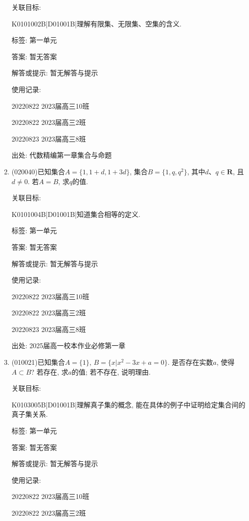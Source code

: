 \documentclass[10pt,a4paper]{article}
\begin{document}
\begin{enumerate}[1.]
关联目标:

K0101002B|D01001B|理解有限集、无限集、空集的含义.



标签: 第一单元

答案: 暂无答案

解答或提示: 暂无解答与提示

使用记录:

20220822	2023届高三10班	

20220822	2023届高三2班	

20220823	2023届高三8班	


出处: 代数精编第一章集合与命题
\item { (020040)}已知集合$A=\{1, 1+d, 1+3d\}$, 集合$B=\{1, q, q^2\}$, 其中$d$、$q\in \mathbf{R}$, 且$d\ne 0$. 若$A=B$, 求$q$的值.


关联目标:

K0101004B|D01001B|知道集合相等的定义.



标签: 第一单元

答案: 暂无答案

解答或提示: 暂无解答与提示

使用记录:

20220822	2023届高三10班	

20220822	2023届高三2班	

20220823	2023届高三8班	


出处: 2025届高一校本作业必修第一章
\item { (010021)}已知集合$A=\{1\}$, $B=\{x|x^2-3x+a=0\}$. 是否存在实数$a$, 使得$A\subset B$?  若存在, 求$a$的值; 若不存在, 说明理由.


关联目标:

K0103005B|D01001B|理解真子集的概念, 能在具体的例子中证明给定集合间的真子集关系.



标签: 第一单元

答案: 暂无答案

解答或提示: 暂无解答与提示

使用记录:

20220822	2023届高三10班	

20220822	2023届高三2班	


\end{enumerate}
\end{document}
